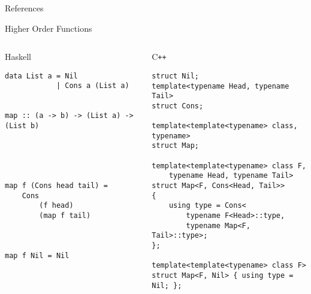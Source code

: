 \documentclass[aspectratio=169]{beamer}
\begin{document}

\begin{frame}{References}

    \nocite{*}
    
    \printbibliography
\end{frame}


\begin{frame}[fragile]{Higher Order Functions}
    \addtocounter{framenumber}{-1}
    \begin{columns}[t] 
        \begin{column}{0.5\textwidth}
            \scriptsize
            \begin{block}{Haskell}
                \begin{verbatim}
data List a = Nil 
            | Cons a (List a)
            
            
map :: (a -> b) -> (List a) -> (List b)





map f (Cons head tail) = 
    Cons 
        (f head) 
        (map f tail)
        


map f Nil = Nil
                \end{verbatim}
            \end{block}
        \end{column}

        \begin{column}{0.5\textwidth}
            \scriptsize
            \begin{block}{C\texttt{++}}
                \begin{verbatim}
struct Nil;
template<typename Head, typename Tail>
struct Cons;

template<template<typename> class, typename> 
struct Map;

template<template<typename> class F, 
    typename Head, typename Tail>
struct Map<F, Cons<Head, Tail>> 
{
    using type = Cons<
        typename F<Head>::type, 
        typename Map<F, Tail>::type>;
};

template<template<typename> class F>
struct Map<F, Nil> { using type = Nil; };
                \end{verbatim}
            \end{block}
        \end{column}
    \end{columns}
\end{frame}


\end{document}
